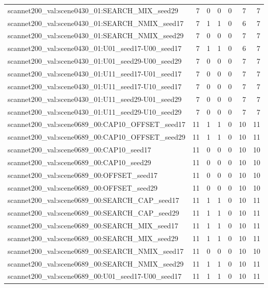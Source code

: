 \begin{table}[t]
\begin{tabular}{lrrrrrr}
scannet200\_val:scene0430\_01:SEARCH\_MIX\_seed29 & 7 & 0 & 0 & 0 & 7 & 7 \\
scannet200\_val:scene0430\_01:SEARCH\_NMIX\_seed17 & 7 & 1 & 1 & 0 & 6 & 7 \\
scannet200\_val:scene0430\_01:SEARCH\_NMIX\_seed29 & 7 & 0 & 0 & 0 & 7 & 7 \\
scannet200\_val:scene0430\_01:U01\_seed17-U00\_seed17 & 7 & 1 & 1 & 0 & 6 & 7 \\
scannet200\_val:scene0430\_01:U01\_seed29-U00\_seed29 & 7 & 0 & 0 & 0 & 7 & 7 \\
scannet200\_val:scene0430\_01:U11\_seed17-U01\_seed17 & 7 & 0 & 0 & 0 & 7 & 7 \\
scannet200\_val:scene0430\_01:U11\_seed17-U10\_seed17 & 7 & 0 & 0 & 0 & 7 & 7 \\
scannet200\_val:scene0430\_01:U11\_seed29-U01\_seed29 & 7 & 0 & 0 & 0 & 7 & 7 \\
scannet200\_val:scene0430\_01:U11\_seed29-U10\_seed29 & 7 & 0 & 0 & 0 & 7 & 7 \\
scannet200\_val:scene0689\_00:CAP10\_OFFSET\_seed17 & 11 & 1 & 1 & 0 & 10 & 11 \\
scannet200\_val:scene0689\_00:CAP10\_OFFSET\_seed29 & 11 & 1 & 1 & 0 & 10 & 11 \\
scannet200\_val:scene0689\_00:CAP10\_seed17 & 11 & 0 & 0 & 0 & 10 & 10 \\
scannet200\_val:scene0689\_00:CAP10\_seed29 & 11 & 0 & 0 & 0 & 10 & 10 \\
scannet200\_val:scene0689\_00:OFFSET\_seed17 & 11 & 0 & 0 & 0 & 10 & 10 \\
scannet200\_val:scene0689\_00:OFFSET\_seed29 & 11 & 0 & 0 & 0 & 10 & 10 \\
scannet200\_val:scene0689\_00:SEARCH\_CAP\_seed17 & 11 & 1 & 1 & 0 & 10 & 11 \\
scannet200\_val:scene0689\_00:SEARCH\_CAP\_seed29 & 11 & 1 & 1 & 0 & 10 & 11 \\
scannet200\_val:scene0689\_00:SEARCH\_MIX\_seed17 & 11 & 1 & 1 & 0 & 10 & 11 \\
scannet200\_val:scene0689\_00:SEARCH\_MIX\_seed29 & 11 & 1 & 1 & 0 & 10 & 11 \\
scannet200\_val:scene0689\_00:SEARCH\_NMIX\_seed17 & 11 & 0 & 0 & 0 & 10 & 10 \\
scannet200\_val:scene0689\_00:SEARCH\_NMIX\_seed29 & 11 & 1 & 1 & 0 & 10 & 11 \\
scannet200\_val:scene0689\_00:U01\_seed17-U00\_seed17 & 11 & 1 & 1 & 0 & 10 & 11 \\

\end{tabular}
\end{table}
